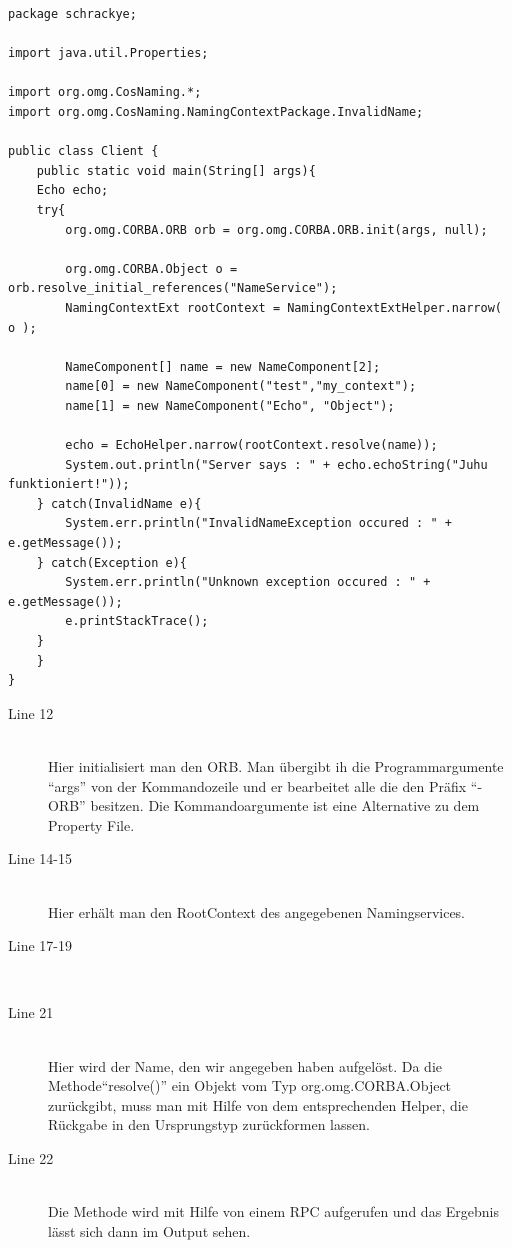 \documentclass[11pt]{article}
\begin{document}
\begin{lstlisting}
package schrackye;

import java.util.Properties;

import org.omg.CosNaming.*;
import org.omg.CosNaming.NamingContextPackage.InvalidName;

public class Client {
    public static void main(String[] args){
	Echo echo;
	try{
	    org.omg.CORBA.ORB orb = org.omg.CORBA.ORB.init(args, null);

	    org.omg.CORBA.Object o = orb.resolve_initial_references("NameService");
	    NamingContextExt rootContext = NamingContextExtHelper.narrow( o );
			
	    NameComponent[] name = new NameComponent[2];
	    name[0] = new NameComponent("test","my_context");
	    name[1] = new NameComponent("Echo", "Object");
		
	    echo = EchoHelper.narrow(rootContext.resolve(name));
	    System.out.println("Server says : " + echo.echoString("Juhu funktioniert!"));
	} catch(InvalidName e){
	    System.err.println("InvalidNameException occured : " + e.getMessage());
	} catch(Exception e){
	    System.err.println("Unknown exception occured : " + e.getMessage());
	    e.printStackTrace();
	}
    }
}
\end{lstlisting}

\begin{description}
\item[Line 12] \hfill \\
Hier initialisiert man den ORB. Man übergibt ih die Programmargumente ``args'' von der Kommandozeile und er bearbeitet alle die den Präfix ``-ORB'' besitzen. Die Kommandoargumente ist eine Alternative zu dem Property File.

\item[Line 14-15] \hfill \\
Hier erhält man den RootContext des angegebenen Namingservices. 

\item[Line 17-19] \hfill \\

\item[Line 21] \hfill \\
Hier wird der Name, den wir angegeben haben aufgelöst. Da die Methode``resolve()'' ein Objekt vom Typ org.omg.CORBA.Object zurückgibt, muss man mit Hilfe von dem entsprechenden Helper, die Rückgabe in den Ursprungstyp zurückformen lassen.

\item[Line 22] \hfill \\
Die Methode wird mit Hilfe von einem RPC aufgerufen und das Ergebnis lässt sich dann im Output sehen.

\end{description}
\end{document}
